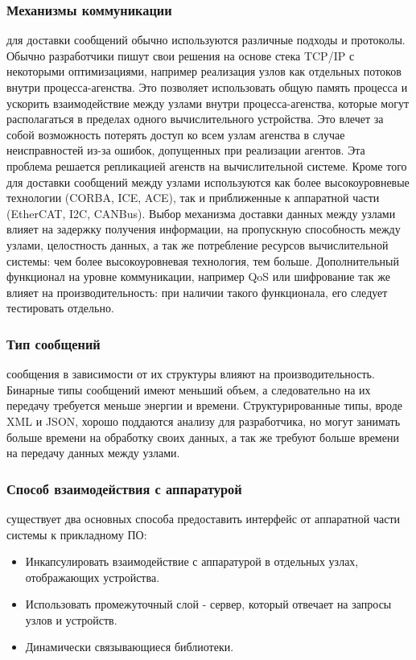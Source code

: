 \subsubsection{Механизмы коммуникации} для доставки сообщений обычно используются различные подходы и протоколы. Обычно разработчики пишут свои решения на основе стека TCP/IP с некоторыми оптимизациями, например реализация узлов как отдельных потоков внутри процесса-агенства. Это позволяет использовать общую память процесса и ускорить взаимодействие между узлами внутри процесса-агенства, которые могут располагаться в пределах одного вычислительного устройства. Это влечет за собой возможность потерять доступ ко всем узлам агенства в случае неисправностей из-за ошибок, допущенных при реализации агентов. Эта проблема решается репликацией агенств на вычислительной системе. Кроме того для доставки сообщений между узлами используются как более высокоуровневые технологии (CORBA, ICE, ACE), так и приближенные к аппаратной части (EtherCAT, I2C, CANBus). Выбор механизма доставки данных между узлами влияет на задержку получения информации, на пропускную способность между узлами, целостность данных, а так же потребление ресурсов вычислительной системы: чем более высокоуровневая технология, тем больше. Дополнительный функционал на уровне коммуникации, например QoS или шифрование так же влияет на производительность: при наличии такого функционала, его следует тестировать отдельно.

\subsubsection{Тип сообщений} сообщения в зависимости от их структуры влияют на производительность. Бинарные типы сообщений имеют меньший объем, а следовательно на их передачу требуется меньше энергии и времени. Структурированные типы, вроде XML и JSON, хорошо поддаются анализу для разработчика, но могут занимать больше времени на обработку своих данных, а так же требуют больше времени на передачу данных между узлами.

\subsubsection{Способ взаимодействия с аппаратурой} существует два основных способа предоставить интерфейс от аппаратной части системы к прикладному ПО:
\begin{itemize}
	\item Инкапсулировать взаимодействие с аппаратурой в отдельных узлах, отображающих устройства.
	\item Использовать промежуточный слой - сервер, который отвечает на запросы узлов и устройств.
	\item Динамически связывающиеся библиотеки.
\end{itemize}

